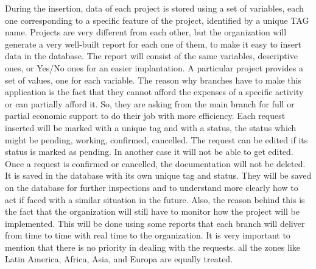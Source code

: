 During the insertion, data of each project is stored using a set of variables, each one corresponding to a specific feature of the project, identified by a unique TAG name. Projects are very different from each other, but the organization will generate a very well-built report for each one of them, to make it easy to insert data in the database. The report will consist of the same variables, descriptive ones, or Yes/No ones for an easier implantation. A particular project provides a set of values, one for each variable. The reason why branches have to make this application is the fact that they cannot afford the expenses of a specific activity or can partially afford it. So, they are asking from the main branch for full or partial economic support to do their job with more efficiency.
Each request inserted will be marked with a unique tag and with a status, the status which might be pending, working, confirmed, cancelled. The request can be edited if its status is marked as pending. In another case it will not be able to get edited. Once a request is confirmed or cancelled, the documentation will not be deleted. It is saved in the database with its own unique tag and status. They will be saved on the database for further inspections and to understand more clearly how to act if faced with a similar situation in the future. Also, the reason behind this is the fact that the organization will still have to monitor how the project will be implemented. This will be done using some reports that each branch will deliver from time to time with real time to the organization. It is very important to mention that there is no priority in dealing with the requests. all the zones like Latin America, Africa, Asia, and Europa are equally treated.

